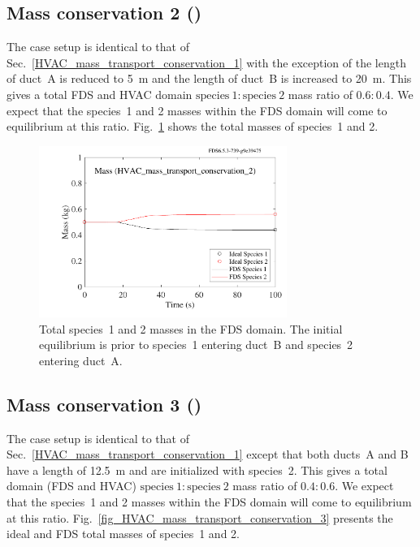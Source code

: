 \documentclass[11pt]{book}
\begin{document}
\subsection{Mass conservation 2 (\texorpdfstring{}{HVAC\_mass\_transport\_conservation\_2})}
\label{HVAC_mass_transport_conservation_2}
The case setup is identical to that of Sec.~\ref{HVAC_mass_transport_conservation_1} with the exception of the length of duct~A is reduced to \SI{5}{\meter} and the length of duct~B is increased to \SI{20}{\meter}. This gives a total FDS and HVAC domain \(\text{species}\ 1 \colon \text{species}\ 2\) mass ratio of \(0.6 \colon 0.4\). We expect that the species~1 and 2 masses within the FDS domain will come to equilibrium at this ratio. Fig.~\ref{fig_HVAC_mass_transport_conservation_2} shows the total masses of species~1 and 2.

\begin{figure}[ht]
\centering
\includegraphics[height=2.2in]{SCRIPT_FIGURES/HVAC_mass_transport_conservation_2}
\caption[ test case]{Total species~1 and 2 masses in the FDS domain. The initial equilibrium is prior to species~1 entering duct~B and species~2 entering duct~A.}
\label{fig_HVAC_mass_transport_conservation_2}
\end{figure}

\subsection{Mass conservation 3 (\texorpdfstring{}{HVAC\_mass\_transport\_conservation\_3})}
\label{HVAC_mass_transport_conservation_3}
The case setup is identical to that of Sec.~\ref{HVAC_mass_transport_conservation_1} except that both ducts~A and B have a length of \SI{12.5}{\meter} and are initialized with species~2. This gives a total domain (FDS and HVAC) \(\text{species}\ 1 \colon \text{species}\ 2\) mass ratio of \(0.4 \colon 0.6\). We expect that the species~1 and 2 masses within the FDS domain will come to equilibrium at this ratio. Fig.~\ref{fig_HVAC_mass_transport_conservation_3} presents the ideal and FDS total masses of species~1 and 2.
\end{document}
